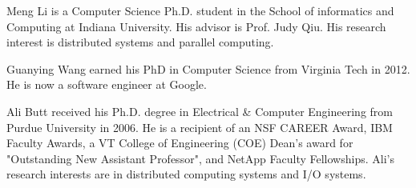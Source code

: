 \vspace{-2.5cm}

\begin{IEEEbiography}{Meng Li}
 is a Computer Science Ph.D. student in the School of informatics and Computing
 at Indiana University. His advisor is Prof. Judy Qiu. His research interest is
 distributed systems and parallel computing.  \end{IEEEbiography}

\vspace{-2.5cm}

\begin{IEEEbiography}{Guanying Wang}
 earned his PhD in Computer Science from Virginia Tech in 2012. He is now a
 software engineer at Google.  \end{IEEEbiography}

\vspace{-2.5cm}

\begin{IEEEbiography}{Ali Butt}
 received his Ph.D. degree in Electrical \& Computer Engineering from Purdue
 University in 2006. He is a recipient of an NSF CAREER Award, IBM Faculty
 Awards, a VT College of Engineering (COE) Dean's award for "Outstanding New
 Assistant Professor", and NetApp Faculty Fellowships. Ali's research interests
 are in distributed computing systems and I/O systems.  \end{IEEEbiography}

\vspace{-2.0cm}


